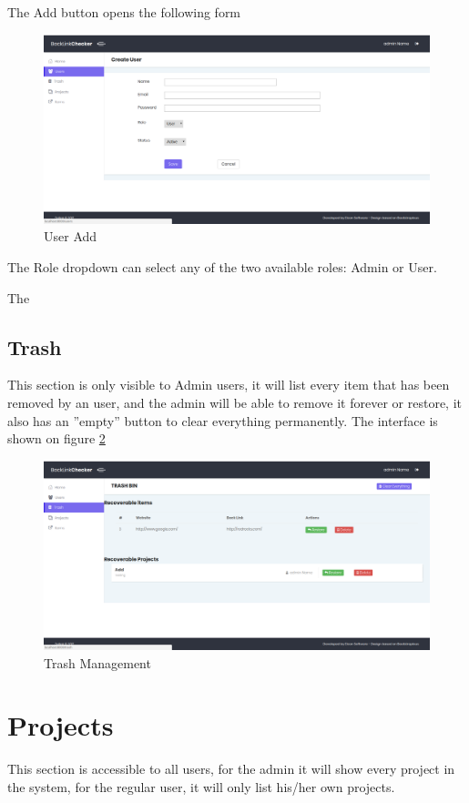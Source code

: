 The Add button opens the following form
\begin{figure}[H]
	\caption{User Add}
	\label{img:usradd}
	\includegraphics[width=\textwidth]{images/users_add}
\end{figure}
The Role dropdown can select any of the two available roles: Admin or User.

The 

\subsection{Trash}
This section is only visible to Admin users, it will list every item that has been removed by an user, and the admin will be able to remove it forever or restore, it also has an ''empty'' button to clear everything permanently. 
The interface is shown on figure \ref{img:trash}

\begin{figure}[H]
	\caption{Trash Management}
	\label{img:trash}
	\includegraphics[width=\textwidth]{images/trash_manage.png}
\end{figure}

\section{Projects}
This section is accessible to all users, for the admin it will show every project in the system, for the regular user, it will only list his/her own projects.


